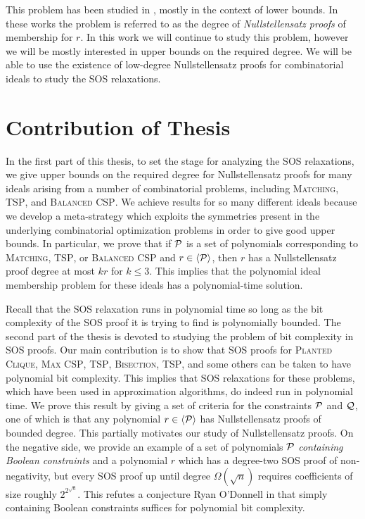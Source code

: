 This problem has been studied in \cite{BIKPP94,BT98,Gri98,BGIP01}, mostly in the context of lower bounds. In these works the problem is referred to as the degree of \emph{Nullstellensatz proofs} of membership for $r$. In this work we will continue to study this problem, however we will be mostly interested in upper bounds on the required degree. We will be able to use the existence of low-degree Nullstellensatz proofs for combinatorial ideals to study the SOS relaxations. 



\section{Contribution of Thesis}\label{sec:intro_contrib}

In the first part of this thesis, to set the stage for analyzing the SOS relaxations, we give upper bounds on the required degree for Nullstellensatz proofs for many ideals arising from a number of combinatorial problems, including \textsc{Matching}, \textsc{TSP}, and \textsc{Balanced CSP}. We achieve results for so many different ideals because we develop a meta-strategy which exploits the symmetries present in the underlying combinatorial optimization problems in order to give good upper bounds. In particular, we prove that if $\mathcal P$ is a set of polynomials corresponding to \textsc{Matching}, \textsc{TSP}, or \textsc{Balanced CSP} and $r \in \langle \mathcal P \rangle$, then $r$ has a Nullstellensatz proof degree at most $kr$ for $k\leq 3$. This implies that the polynomial ideal membership problem for these ideals has a polynomial-time solution. 

Recall that the SOS relaxation runs in polynomial time so long as the bit complexity of the SOS proof it is trying to find is polynomially bounded. 
The second part of the thesis is devoted to studying the problem of bit complexity in SOS proofs. 
Our main contribution is to show that SOS proofs for \textsc{Planted Clique}, \textsc{Max CSP}, \textsc{TSP}, \textsc{Bisection}, \textsc{TSP}, and some others can be taken to have polynomial bit complexity. This implies that SOS relaxations for these problems, which have been used in approximation algorithms, do indeed run in polynomial time. We prove this result by giving a set of criteria for the constraints $\mathcal P$ and $\mathcal Q$, one of which is that any polynomial $r \in \langle \mathcal P \rangle$ has Nullstellensatz proofs of bounded degree. This partially motivates our study of Nullstellensatz proofs. 
On the negative side, we provide an example of a set of polynomials $\mathcal P$ \emph{containing Boolean constraints} and a polynomial $r$ which has a degree-two SOS proof of non-negativity, but every SOS proof up until degree $\Omega(\sqrt{n})$ requires coefficients of size roughly $2^{2^{\sqrt{n}}}$. This refutes a conjecture Ryan O'Donnell in \cite{ODon16} that simply containing Boolean constraints suffices for polynomial bit complexity. 

